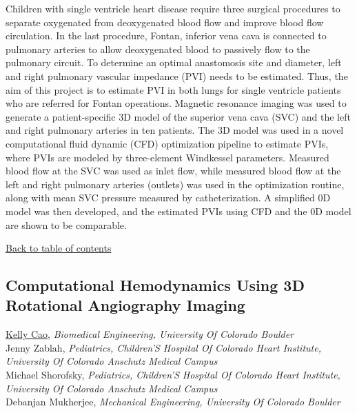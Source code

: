 \noindent Children with single ventricle heart disease require three surgical procedures to separate oxygenated from deoxygenated blood flow and improve blood flow circulation. In the last procedure, Fontan, inferior vena cava is connected to pulmonary arteries to allow deoxygenated blood to passively flow to the pulmonary circuit. To determine an optimal anastomosis site and diameter, left and right pulmonary vascular impedance (PVI) needs to be estimated. Thus, the aim of this project is to estimate PVI in both lungs for single ventricle patients who are referred for Fontan operations. Magnetic resonance imaging was used to generate a patient-specific 3D model of the superior vena cava (SVC) and the left and right pulmonary arteries in ten patients. The 3D model was used in a novel computational fluid dynamic (CFD) optimization pipeline to estimate PVIs, where PVIs are modeled by three-element Windkessel parameters. Measured blood flow at the SVC was used as inlet flow, while measured blood flow at the left and right pulmonary arteries (outlets) was used in the optimization routine, along with mean SVC pressure measured by catheterization. A simplified 0D model was then developed, and the estimated PVIs using CFD and the 0D model are shown to be comparable. \\ 
\begin{flushright}\vspace{-0.2 in}\hyperlink{toc}{Back to table of contents}\end{flushright}\vspace{-0.2 in}
\hypertarget{KellyCao}{\subsection*{\color{CUGOLD} Computational Hemodynamics Using 3D Rotational Angiography Imaging}} \vsp 
\underline{Kelly Cao}, \textit{Biomedical Engineering, University Of Colorado Boulder}\\ 
{Jenny Zablah}, \textit{Pediatrics, Children’S Hospital Of Colorado Heart Institute, University Of Colorado Anschutz Medical Campus}\\ 
{Michael Shorofsky}, \textit{Pediatrics, Children’S Hospital Of Colorado Heart Institute, University Of Colorado Anschutz Medical Campus}\\ 
{Debanjan Mukherjee}, \textit{Mechanical Engineering, University Of Colorado Boulder}\\ 
\vspace{-0.1 in} \\ 
